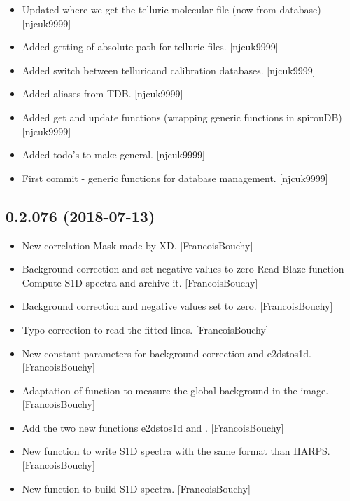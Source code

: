 \documentclass[a4paper,10pt,english]{report}
\begin{document}
\begin{itemize}
\item {} 
Updated where we get the telluric molecular file (now from database)
{[}njcuk9999{]}

\item {} 
Added getting of absolute path for telluric files. {[}njcuk9999{]}

\item {} 
Added switch between telluricand calibration databases. {[}njcuk9999{]}

\item {} 
Added aliases from TDB. {[}njcuk9999{]}

\item {} 
Added get and update functions (wrapping generic functions in
spirouDB) {[}njcuk9999{]}

\item {} 
Added todo’s to make general. {[}njcuk9999{]}

\item {} 
First commit - generic functions for database management. {[}njcuk9999{]}

\end{itemize}


\subsection{0.2.076 (2018-07-13)}
\label{\detokenize{misc/changelog:id394}}\begin{itemize}
\item {} 
New correlation Mask made by XD. {[}FrancoisBouchy{]}

\item {} 
Background correction and set negative values to zero Read Blaze
function Compute S1D spectra and archive it. {[}FrancoisBouchy{]}

\item {} 
Background correction and negative values set to zero.
{[}FrancoisBouchy{]}

\item {} 
Typo correction to read the fitted lines. {[}FrancoisBouchy{]}

\item {} 
New constant parameters for background correction and e2dstos1d.
{[}FrancoisBouchy{]}

\item {} 
Adaptation of function to measure the global background in the image.
{[}FrancoisBouchy{]}

\item {} 
Add the two new functions e2dstos1d and . {[}FrancoisBouchy{]}

\item {} 
New function to write S1D spectra with the same format than HARPS.
{[}FrancoisBouchy{]}

\item {} 
New function to build S1D spectra. {[}FrancoisBouchy{]}

\end{itemize}
\end{document}
